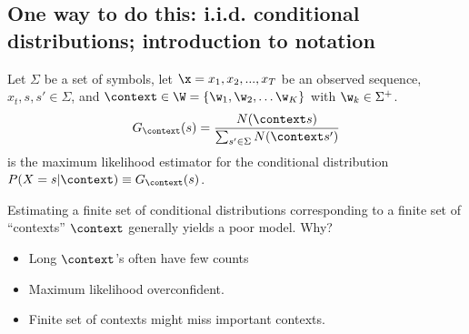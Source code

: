 \documentclass[16pt]{beamer}
\begin{document}

\subsection{One way to do this: i.i.d. conditional distributions; introduction to notation}
\begin{frame}[t]{}
Let $\Sigma$ be a set of symbols, let $\x = x_1, x_2, ..., x_T$ be an observed sequence, $x_t,s,s'  \in \Sigma$, and $\context \in \W = \{\w_1, \w_2, \ldots \w_K\}$ with $\w_k \in \Sigma^+$. 
\begin{align*}
G_\context(s)=\frac{N(\context s)}{\sum_{s'\in\Sigma}N(\context s')}\label{eqn:mll}
\end{align*}
is the maximum likelihood estimator for the conditional distribution ${P}(X=s|\context) \equiv G_\context(s)$.
\vspace{.5cm}

Estimating a finite set of conditional distributions corresponding to a finite set of ``contexts'' $\context$ generally yields a poor model.  Why?

\begin{itemize}
\item Long $\context$'s often have few counts
\item   Maximum likelihood overconfident.
\item   Finite set of contexts might miss important contexts.
\end{itemize}


\end{frame}	
\end{document}
